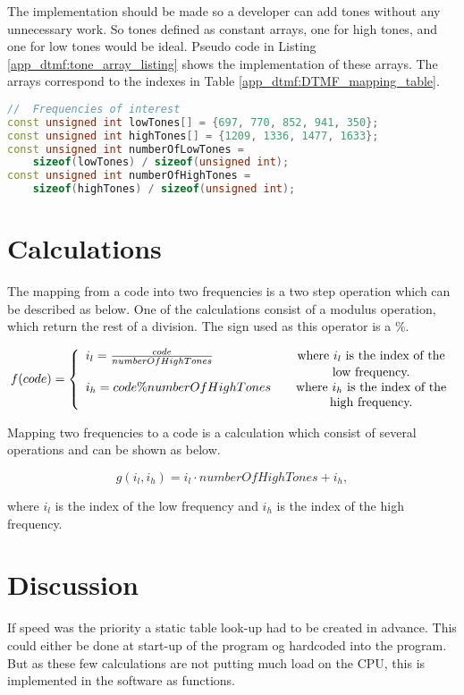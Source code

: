 The implementation should be made so a developer can add tones without any unnecessary work.	
 So tones defined as constant arrays, one for high tones, and one for low tones would be ideal. Pseudo code in Listing \ref{app_dtmf:tone_array_listing} shows the implementation of these arrays. The arrays correspond to the indexes in Table \ref{app_dtmf:DTMF_mapping_table}.
	
	\begin{lstlisting}[float=htb,language={C++},caption={Implementation of tone arrays},label={app_dtmf:tone_array_listing}]
//	Frequencies of interest
const unsigned int lowTones[] = {697, 770, 852, 941, 350};
const unsigned int highTones[] = {1209, 1336, 1477, 1633};
const unsigned int numberOfLowTones =
	sizeof(lowTones) / sizeof(unsigned int);
const unsigned int numberOfHighTones =
	sizeof(highTones) / sizeof(unsigned int);
	\end{lstlisting}
	
	\section{Calculations}
	The mapping from a code into two frequencies is a two step operation which can be described as below. One of the calculations consist of a modulus operation, which return the rest of a division. The sign used as this operator is a \%.
	
	\[
		f(code) = \left\{ 
		\begin{array}{l c}
			i_{l} = \frac{code}{numberOfHighTones} & \quad \text{where $i_{l}$ is the index of the}\\
			& \quad \text{low frequency.}\\
			i_{h} = code \% numberOfHighTones & \quad \text{where $i_{h}$ is the index of the}\\
						& \quad \text{high frequency.}\\
		\end{array} \right.
	\]
	
	Mapping two frequencies to a code is a calculation which consist of several operations and can be shown as below.
	
	\[
		g(i_{l}, i_{h}) = i_{l} \cdot numberOfHighTones + i_{h},
	\]
	
	where $i_{l}$ is the index of the low frequency and $i_{h}$ is the index of the high frequency.
	
	\section{Discussion}
	
If speed was the priority a static table look-up had to be created in advance. This could either be done at start-up of the program og hardcoded into the program. But as these few calculations are not putting much load on the CPU, this is implemented in the software as functions.